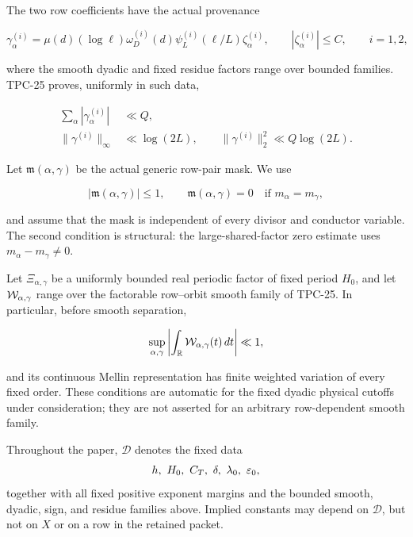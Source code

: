The two row coefficients have the actual provenance

\begin{equation}
 \gamma_\alpha^{(i)}
 =\mu(d)(\log\ell)\omega_D^{(i)}(d)
 \psi_L^{(i)}(\ell/L)\zeta_\alpha^{(i)},
 \qquad |\zeta_\alpha^{(i)}|\le C,
 \qquad i=1,2,
 \label{eq:tpc26-row-provenance}
\end{equation}

where the smooth dyadic and fixed residue factors range over bounded
families.  TPC-25 proves, uniformly in such data,

\begin{align}
 \sum_\alpha|\gamma_\alpha^{(i)}|&\ll Q,
 \label{eq:tpc26-row-l1}\\
 \|\gamma^{(i)}\|_\infty&\ll\log(2L),
 \qquad
 \|\gamma^{(i)}\|_2^2\ll Q\log(2L).
 \label{eq:tpc26-row-l2}
\end{align}

Let \(\mathfrak m(\alpha,\gamma)\) be the actual generic row-pair
mask.  We use

\begin{equation}
 |\mathfrak m(\alpha,\gamma)|\le1,
 \qquad
 \mathfrak m(\alpha,\gamma)=0
 \quad\text{if }m_\alpha=m_\gamma,
 \label{eq:tpc26-mask}
\end{equation}

and assume that the mask is independent of every divisor and conductor
variable.  The second condition is structural: the large-shared-factor
zero estimate uses \(m_\alpha-m_\gamma\ne0\).

Let \(\Xi_{\alpha,\gamma}\) be a uniformly bounded real periodic
factor of fixed period \(H_0\), and let
\(\mathcal W_{\alpha,\gamma}\) range over the factorable row--orbit smooth
family of TPC-25.  In particular, before smooth separation,

\begin{equation}
 \sup_{\alpha,\gamma}
 \left|
 \int_{\mathbb R}\mathcal W_{\alpha,\gamma}(t)\,dt
 \right|\ll1,
 \label{eq:tpc26-zero-functional}
\end{equation}

and its continuous Mellin representation has finite weighted variation
of every fixed order.  These conditions are automatic for the fixed
dyadic physical cutoffs under consideration; they are not asserted for
an arbitrary row-dependent smooth family.

Throughout the paper, \(\mathscr D\) denotes the fixed data
\[
 h,\ H_0,\ C_T,\ \delta,\ \lambda_0,\ \eps_0,
\]
together with all fixed positive exponent margins and the bounded
smooth, dyadic, sign, and residue families above.  Implied constants may
depend on \(\mathscr D\), but not on \(X\) or on a row in the retained
packet.

